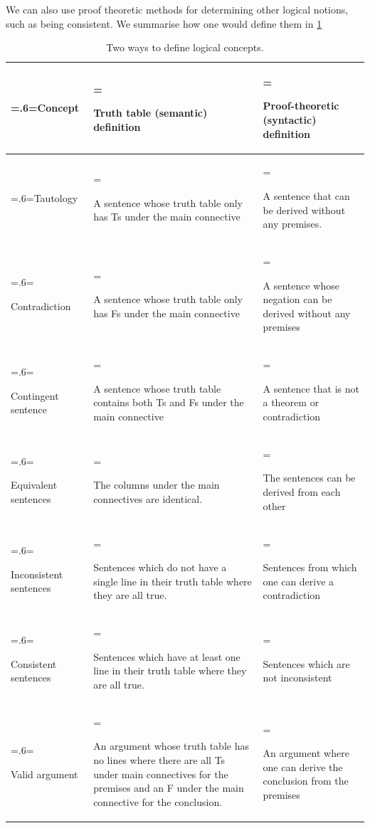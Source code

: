 %
%
%
We can also use proof theoretic methods for determining other logical notions, such as being consistent. We summarise how one would define them in \cref{table:truth_tables_or_derivations}
\begin{table}
\renewcommand{\tabularxcolumn}[1]{m{#1}}
\setlength{\extrarowheight}{1ex}
\begin{tabularx}{\linewidth}{>{\hsize=.6\hsize\linewidth=\hsize\centering\arraybackslash}X || >{\hsize=1.2\hsize\linewidth=\hsize\raggedright\arraybackslash}X | >{\hsize=1.2\hsize\linewidth=\hsize\raggedright\arraybackslash}X}
\textbf{Concept} 		&	\textbf{Truth table (semantic) definition} 	&	\textbf{Proof-theoretic (syntactic) definition} \\ \hline \hline

Tautology   &	A sentence whose truth table only has Ts under the main connective & A sentence that can be derived without any premises.	 \\ \hline

Contradiction		&	A sentence whose truth table only has Fs under the main connective  &	A sentence whose negation can be derived without any premises\\ \hline

Contingent sentence	&	A sentence whose truth table contains both Ts and Fs under the main connective & A sentence that is not a theorem or contradiction \\ \hline

Equivalent sentences &	The columns under the main connectives are identical.& The sentences can be derived from each other	\\ \hline

Inconsistent sentences	&	Sentences which do not have a single line in their truth table where they are all true.	& Sentences  from which one can derive a contradiction \\ \hline

Consistent sentences	&	Sentences which have at least one line in their truth table where they are all true. & Sentences which are not inconsistent	\\ \hline

Valid argument		&	An argument whose truth table has no lines where there are all Ts under main connectives for the premises and an F under the main connective for the conclusion.  & An argument where one can derive the conclusion from the premises	\\
\end{tabularx}
\caption{Two ways to define logical concepts.}
\label{table:truth_tables_or_derivations}
\end{table}

